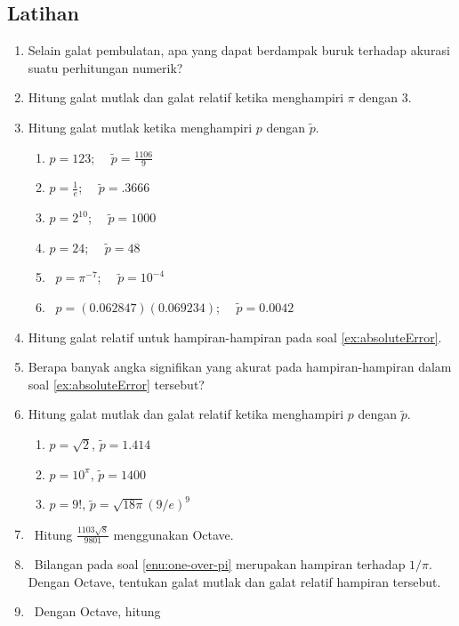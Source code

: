 \subsection{Latihan}
\begin{enumerate}
\item Selain galat pembulatan, apa yang dapat berdampak buruk terhadap akurasi
suatu perhitungan numerik?
\item Hitung galat mutlak dan galat relatif ketika menghampiri $\pi$ dengan
3.
\item \label{ex:absoluteError}Hitung galat mutlak ketika menghampiri $p$
dengan $\tilde{p}$.

\begin{enumerate}
\item \label{exc:abserr1}$p=123$;~~ $\tilde{p}=\frac{1106}{9}$ \hasasolution 
\item $p=\frac{1}{e}$;~~ $\tilde{p}=.3666$
\item \label{exc:abserr2}$p=2^{10}$;~~ $\tilde{p}=1000$ \hasasolution 
\item $p=24$;~~ $\tilde{p}=48$
\item \octave\ \label{exc:abserr3}$p=\pi^{-7}$;~~ $\tilde{p}=10^{-4}$ \hasasolution 
\item \octave\ $p=(0.062847)(0.069234)$;~~ $\tilde{p}=0.0042$
\end{enumerate}
\item \label{exc:abserr15}Hitung galat relatif untuk hampiran-hampiran
pada soal \ref{ex:absoluteError}. \haspartwithsolution 
\item \label{exc:abserr16}Berapa banyak angka signifikan yang akurat pada
hampiran-hampiran dalam soal \ref{ex:absoluteError} tersebut? \haspartwithsolution 
\item Hitung galat mutlak dan galat relatif ketika menghampiri $p$ dengan
$\tilde{p}$.

\begin{enumerate}
\item $p=\sqrt{2}$, $\tilde{p}=1.414$
\item $p=10^{\pi}$, $\tilde{p}=1400$
\item $p=9!$, $\tilde{p}=\sqrt{18\pi}(9/e)^{9}$
\end{enumerate}
\item \octave\ \label{enu:one-over-pi}Hitung ${\displaystyle \frac{1103\sqrt{8}}{9801}}$
menggunakan Octave.
\item \octave\ Bilangan pada soal \ref{enu:one-over-pi} merupakan hampiran
terhadap $1/\pi$. Dengan Octave, tentukan galat mutlak dan galat
relatif hampiran tersebut.
\item \octave\ Dengan Octave, hitung


\end{enumerate}

